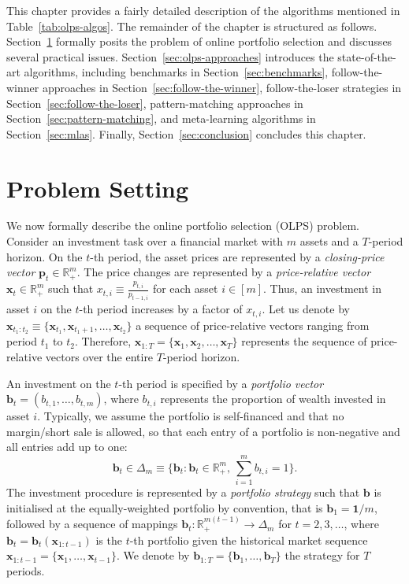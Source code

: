 This chapter provides a fairly detailed description of the algorithms mentioned in Table~\ref{tab:olps-algos}. The remainder of the chapter is structured as follows. Section~\ref{sec:problem-setting} formally posits the problem of online portfolio selection and discusses several practical issues. Section~\ref{sec:olps-approaches} introduces the state-of-the-art algorithms, including benchmarks in Section~\ref{sec:benchmarks}, follow-the-winner approaches in Section~\ref{sec:follow-the-winner}, follow-the-loser strategies in Section~\ref{sec:follow-the-loser}, pattern-matching approaches in Section~\ref{sec:pattern-matching}, and meta-learning algorithms in Section~\ref{sec:mlas}. Finally, Section~\ref{sec:conclusion} concludes this chapter.




\section{Problem Setting}
\label{sec:problem-setting}

We now formally describe the online portfolio selection (OLPS) problem. Consider an investment task over a financial market with $m$ assets and a $T$-period horizon. On the $t$-th period, the asset prices are represented by a \emph{closing-price vector} $\mathbf{p}_t \in \mathbb{R}^m_+$. The price changes are represented by a \emph{price-relative vector} $\mathbf{x}_t \in \mathbb{R}_+^m$ such that $x_{t,i} \equiv \frac{p_{t,i}}{p_{t-1,i}}$ for each asset $i \in [m]$. Thus, an investment in asset $i$ on the $t$-th period increases by a factor of $x_{t,i}$. Let us denote by $\mathbf{x}_{t_1:t_2} \equiv \{\mathbf{x}_{t_1}, \mathbf{x}_{t_1+1}, \ldots, \mathbf{x}_{t_2}\}$ a sequence of price-relative vectors ranging from period $t_1$ to $t_2$. Therefore, $\mathbf{x}_{1:T} = \{\mathbf{x}_{1}, \mathbf{x}_{2}, \ldots, \mathbf{x}_{T}\}$ represents the sequence of price-relative vectors over the entire $T$-period horizon.

An investment on the $t$-th period is specified by a \emph{portfolio vector} $\mathbf{b}_t = (b_{t,1}, \ldots, b_{t,m})$, where $b_{t,i}$ represents the proportion of wealth invested in asset $i$. Typically, we assume the portfolio is self-financed and that no margin/short sale is allowed, so that each entry of a portfolio is non-negative and all entries add up to one:
\begin{equation}
	\mathbf{b}_t \in \Delta_m
	\equiv \Big\{\mathbf{b}_t : \mathbf{b}_t \in \mathbb{R}^m_+,\, \sum_{i =1}^m b_{t,i} = 1\Big\}.
\end{equation}
The investment procedure is represented by a \emph{portfolio strategy} such that $\mathbf{b}$ is initialised at the equally-weighted portfolio by convention, that is $\mathbf{b}_1 = \mathbf{1}/m$, followed by a sequence of mappings $\mathbf{b}_t : \mathbb{R}^{m(t-1)}_{+} \rightarrow \Delta_m$ for $t = 2, 3, \ldots$, where $\mathbf{b}_t = \mathbf{b}_t(\mathbf{x}_{1:t-1})$ is the $t$-th portfolio given the historical market sequence $\mathbf{x}_{1:t-1} = \{\mathbf{x}_1, \ldots, \mathbf{x}_{t-1}\}$. We denote by $\mathbf{b}_{1:T} = \{\mathbf{b}_1, \ldots, \mathbf{b}_T\}$ the strategy for $T$ periods.

